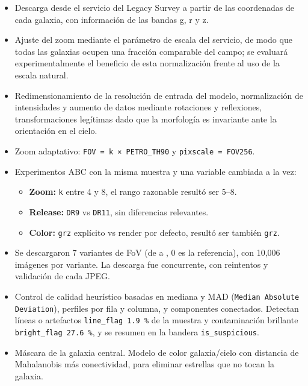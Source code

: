 \begin{itemize}

    \item Descarga desde el servicio del Legacy Survey a partir de las coordenadas de cada galaxia, con información de las bandas g, r y z.

    \item Ajuste del zoom mediante el parámetro de escala del servicio, de modo que todas las galaxias ocupen una fracción comparable del campo; se evaluará experimentalmente el beneficio de esta normalización frente al uso de la escala natural.

    \item Redimensionamiento de la resolución de entrada del modelo, normalización de intensidades y aumento de datos mediante rotaciones y reflexiones, transformaciones legítimas dado que la morfología es invariante ante la orientación en el cielo.

    \item Zoom adaptativo:  \texttt{FOV = k × PETRO\_TH90} y  \texttt{pixscale = FOV\/256}.

    \item Experimentos ABC con la misma muestra y una variable cambiada a la vez:

            \begin{itemize}

                \item \textbf{Zoom:} \texttt{k} entre 4 y 8, el rango razonable resultó ser 5–8.

                \item \textbf{Release:} \texttt{DR9} vs \texttt{DR11}, sin diferencias relevantes.

                \item \textbf{Color:} \texttt{grz} explícito vs render por defecto, resultó ser también \texttt{grz}.

            \end{itemize}

    \item Se descargaron 7 variantes de FoV (de  a , 0 es la referencia), con 10,006 imágenes por variante. La descarga fue concurrente, con reintentos y validación de cada JPEG.

    \item Control de calidad heurístico basadas en mediana y MAD (\texttt{Median Absolute Deviation}), perfiles por fila y columna, y componentes conectados. Detectan líneas o artefactos \texttt{line\_flag 1.9 \%} de la muestra y contaminación brillante \texttt{bright\_flag 27.6 \%}, y se resumen en la bandera \texttt{is\_suspicious}.

    \item Máscara de la galaxia central. Modelo de color galaxia/cielo con distancia de Mahalanobis más conectividad, para eliminar estrellas que no tocan la galaxia.

\end{itemize}

